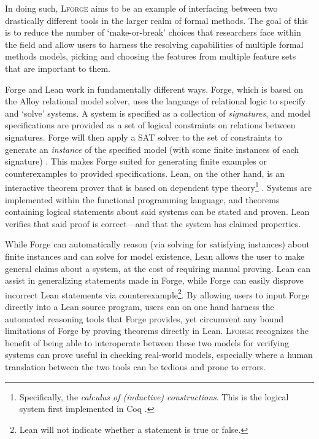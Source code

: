 In doing such, \textsc{Lforge} aims to be an example of interfacing between two drastically different tools in the larger realm of formal methods. The goal of this is to reduce the number of `make-or-break' choices that researchers face within the field and allow users to harness the resolving capabilities of multiple formal methods models, picking and choosing the features from multiple feature sets that are important to them. 

Forge and Lean work in fundamentally different ways. Forge, which is based on the Alloy relational model solver, uses the language of relational logic to specify and `solve' systems. A system is specified as a collection of \emph{signatures}, and model specifications are provided as a set of logical constraints on relations between signatures. Forge will then apply a SAT solver to the set of constraints to generate an \emph{instance} of the specified model (with some finite instances of each signature) \cite{jackson2019alloy,ngpdbccdlrrvwwk-oopsla-2024}. This makes Forge suited for generating finite examples or counterexamples to provided specifications. Lean, on the other hand, is an interactive theorem prover that is based on dependent type theory\footnote{Specifically, the \emph{calculus of (inductive) constructions}. This is the logical system first implemented in Coq \cite{bertot2008short}.} \cite{avigad2024theorem}. Systems are implemented within the functional programming language, and theorems containing logical statements about said systems can be stated and proven. Lean verifies that said proof is correct---and that the system has claimed properties.

While Forge can automatically reason (via solving for satisfying instances) about finite instances and can solve for model existence, Lean allows the user to make general claims about a system, at the cost of requiring manual proving. Lean can assist in generalizing statements made in Forge, while Forge can easily disprove incorrect Lean statements via counterexample\footnote{Lean will not indicate whether a statement is true or false.}. By allowing users to input Forge directly into a Lean source program, users can on one hand harness the automated reasoning tools that Forge provides, yet circumvent any bound limitations of Forge by proving theorems directly in Lean. \textsc{Lforge} recognizes the benefit of being able to interoperate between these two models for verifying systems can prove useful in checking real-world models, especially where a human translation between the two tools can be tedious and prone to errors. 

